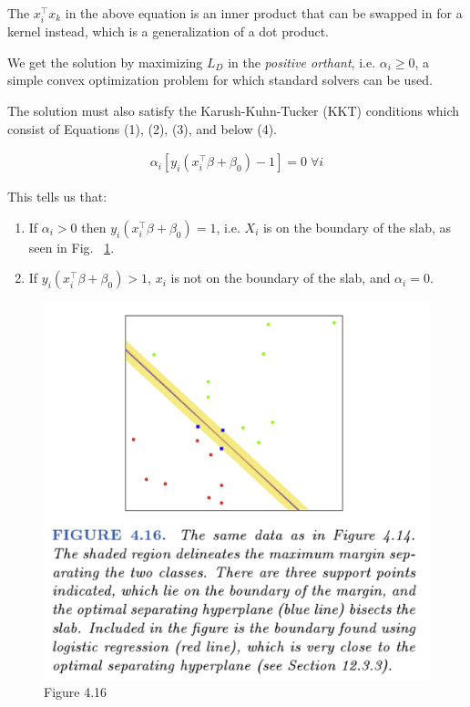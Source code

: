 \documentclass[a4paper]{article}
\begin{document}
The $x_i^\top x_k$ in the above equation is an inner product that can be swapped in for a kernel instead, which is a generalization of a dot product.

We get the solution by maximizing $L_D$ in the \emph{positive orthant}, i.e. $\alpha_i \geq 0$, a simple convex optimization problem for which standard solvers can be used.

The solution must also satisfy the Karush-Kuhn-Tucker (KKT) conditions which consist of Equations (1), (2), (3), and below (4).

\begin{align}
\alpha_i [y_i (x_i^\top \beta + \beta_0) -1] = 0 \; \forall i
\end{align}

This tells us that:
\begin{enumerate}
\item If $\alpha_i > 0$ then $y_i (x_i^\top \beta + \beta_0) =1$, i.e. $X_i$ is on the boundary of the slab, as seen in Fig. ~\ref{fig:svm1}. 
\item If $y_i (x_i^\top \beta + \beta_0) > 1$, $x_i$ is not on the boundary of the slab, and $\alpha_i=0$.
\end{enumerate}

\begin{figure}
\centering
\includegraphics[width=1.0\textwidth]{fig4_16.png}
\caption{\label{fig:svm1}Figure 4.16}
\end{figure}
\end{document}
